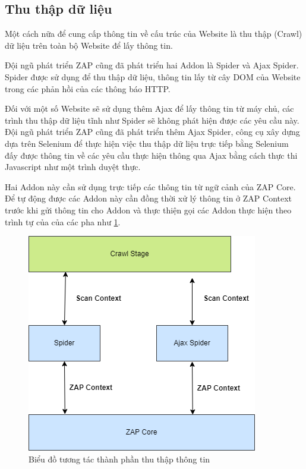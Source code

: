 \documentclass[./../main.tex]{subfiles}
\begin{document}
\subsection{Thu thập dữ liệu}

Một cách nữa để cung cấp thông tin về cấu trúc của Website là
thu thập (Crawl) dữ liệu trên toàn bộ Website để lấy thông tin.

Đội ngũ phát triển ZAP cũng đã phát triển hai Addon là Spider và
Ajax Spider. Spider được sử dụng để thu thập dữ liệu, thông tin lấy từ cây
DOM của Website trong các phản hồi của các thông báo HTTP.

Đối với một số Website sẽ sử dụng thêm Ajax để lấy thông tin từ máy
chủ, các trình thu thập dữ liệu tĩnh như Spider sẽ không phát hiện được các yêu cầu này.
Đội ngũ phát triển ZAP cũng đã phát triển thêm Ajax Spider, công cụ xây
dựng dựa trên Selenium để thực hiện việc thu thập dữ liệu trực tiếp bằng
Selenium đấy được thông tin về các yêu cầu thực hiện thông qua Ajax
bằng cách thực thi Javascript như một trình duyệt thực.

Hai Addon này cần sử dụng trực tiếp các thông tin từ ngữ cảnh của ZAP Core.
Để tự động được các Addon này cần đồng thời xử lý thông tin ở ZAP Context
trước khi gửi thông tin cho Addon và thực thiện gọi các Addon thực hiện
theo trình tự của của các pha như \ref{fig:crawl_stage}.

\begin{figure}[ht!]
	\includegraphics[width=\linewidth]{./images/crawl_stage.png}
	\caption{Biểu đồ tương tác thành phần thu thập thông tin}
	\label{fig:crawl_stage}
\end{figure}
\end{document}
